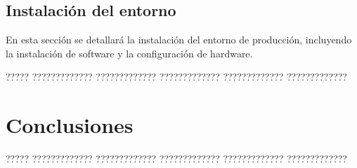 \documentclass[11pt,spanish,listoffigures,listoftables]{tfgetsinf}
\begin{document}
\section{Instalación del entorno} \label{sub:instalacion_entorno}
En esta sección se detallará la instalación del entorno de producción, incluyendo la instalación de software y la configuración de hardware.






????? ????????????? ????????????? ????????????? ????????????? ?????????????



\chapter{Conclusiones} \label{chap:conclusiones}

????? ????????????? ????????????? ????????????? ????????????? ?????????????


\printglossary[type=\acronymtype]




\end{document}
